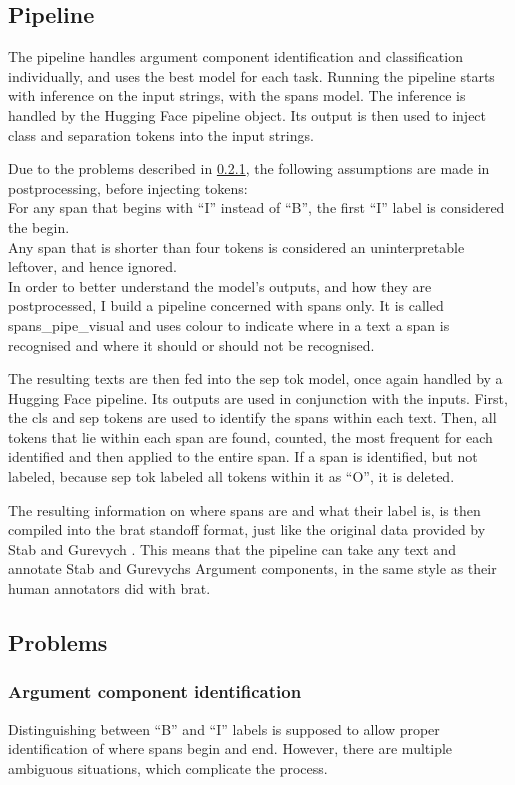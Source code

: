 \documentclass[12]{article}
\theoremstyle{mytheoremstyle}
\theoremstyle{mytheoremstyle}
\theoremstyle{myproblemstyle}
\begin{document}
  \subsection{Pipeline} \label{pipeline}
  The pipeline handles argument component identification and classification individually, and uses the best model for each task. 
  Running the pipeline starts with inference on the input strings, with the spans model. 
  The inference is handled by the Hugging Face pipeline object. 
  Its output is then used to inject class and separation tokens into the input strings. 

  Due to the problems described in \ref{aci-prob}, the following assumptions are made in postprocessing, before injecting tokens: \\
  For any span that begins with ``I'' instead of ``B'', the first ``I'' label is considered the begin. \\
  Any span that is shorter than four tokens is considered an uninterpretable leftover, and hence ignored.  \\
  In order to better understand the model's outputs, and how they are postprocessed, I build a pipeline concerned with spans only. 
  It is called spans\_pipe\_visual and uses colour to indicate where in a text a span is recognised and where it should or should not be recognised.

  The resulting texts are then fed into the sep tok model, once again handled by a Hugging Face pipeline. 
  Its outputs are used in conjunction with the inputs. 
  First, the cls and sep tokens are used to identify the spans within each text. 
  Then, all tokens that lie within each span are found, counted, the most frequent for each identified and then applied to the entire span. 
  If a span is identified, but not labeled, because sep tok labeled all tokens within it as ``O'', it is deleted.

  The resulting information on where spans are and what their label is, is then compiled into the brat standoff format, just like the original data provided by Stab and Gurevych \cite{stab-gurevych-2017-parsing}. This means that the pipeline can take any text and annotate Stab and Gurevychs Argument components, in the same style as their human annotators did with brat.
  \subsection{Problems} \label{problems}
  \subsubsection{Argument component identification} \label{aci-prob}
  Distinguishing between ``B'' and ``I'' labels is supposed to allow proper identification of where spans begin and end. 
  However, there are multiple ambiguous situations, which complicate the process. 
\end{document}
